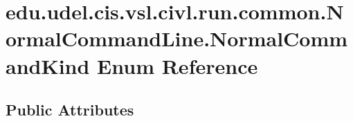 \hypertarget{enumedu_1_1udel_1_1cis_1_1vsl_1_1civl_1_1run_1_1common_1_1NormalCommandLine_1_1NormalCommandKind}{}\section{edu.\+udel.\+cis.\+vsl.\+civl.\+run.\+common.\+Normal\+Command\+Line.\+Normal\+Command\+Kind Enum Reference}
\label{enumedu_1_1udel_1_1cis_1_1vsl_1_1civl_1_1run_1_1common_1_1NormalCommandLine_1_1NormalCommandKind}
\subsection*{Public Attributes}

